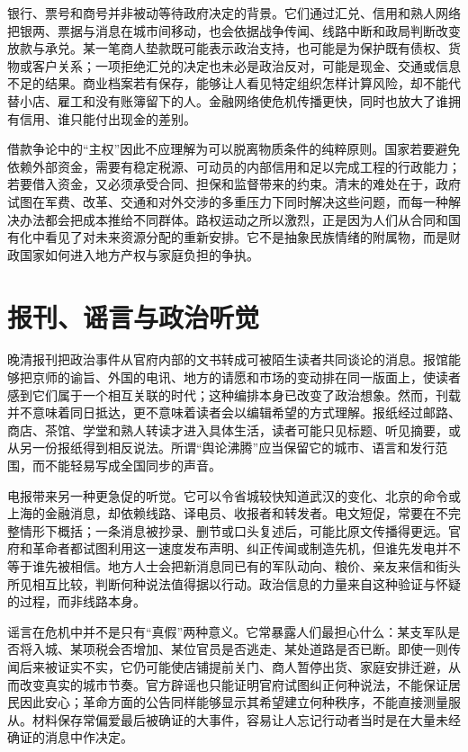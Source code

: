 银行、票号和商号并非被动等待政府决定的背景。它们通过汇兑、信用和熟人网络把银两、票据与消息在城市间移动，也会依据战争传闻、线路中断和政局判断改变放款与承兑。某一笔商人垫款既可能表示政治支持，也可能是为保护既有债权、货物或客户关系；一项拒绝汇兑的决定也未必是政治反对，可能是现金、交通或信息不足的结果。商业档案若有保存，能够让人看见特定组织怎样计算风险，却不能代替小店、雇工和没有账簿留下的人。金融网络使危机传播更快，同时也放大了谁拥有信用、谁只能付出现金的差别。

借款争论中的“主权”因此不应理解为可以脱离物质条件的纯粹原则。国家若要避免依赖外部资金，需要有稳定税源、可动员的内部信用和足以完成工程的行政能力；若要借入资金，又必须承受合同、担保和监督带来的约束。清末的难处在于，政府试图在军费、改革、交通和对外交涉的多重压力下同时解决这些问题，而每一种解决办法都会把成本推给不同群体。路权运动之所以激烈，正是因为人们从合同和国有化中看见了对未来资源分配的重新安排。它不是抽象民族情绪的附属物，而是财政国家如何进入地方产权与家庭负担的争执。

\section{报刊、谣言与政治听觉}

晚清报刊把政治事件从官府内部的文书转成可被陌生读者共同谈论的消息。报馆能够把京师的谕旨、外国的电讯、地方的请愿和市场的变动排在同一版面上，使读者感到它们属于一个相互关联的时代；这种编排本身已改变了政治想象。然而，刊载并不意味着同日抵达，更不意味着读者会以编辑希望的方式理解。报纸经过邮路、商店、茶馆、学堂和熟人转读才进入具体生活，读者可能只见标题、听见摘要，或从另一份报纸得到相反说法。所谓“舆论沸腾”应当保留它的城市、语言和发行范围，而不能轻易写成全国同步的声音。

电报带来另一种更急促的听觉。它可以令省城较快知道武汉的变化、北京的命令或上海的金融消息，却依赖线路、译电员、收报者和转发者。电文短促，常要在不完整情形下概括；一条消息被抄录、删节或口头复述后，可能比原文传播得更远。官府和革命者都试图利用这一速度发布声明、纠正传闻或制造先机，但谁先发电并不等于谁先被相信。地方人士会把新消息同已有的军队动向、粮价、亲友来信和街头所见相互比较，判断何种说法值得据以行动。政治信息的力量来自这种验证与怀疑的过程，而非线路本身。

谣言在危机中并不是只有“真假”两种意义。它常暴露人们最担心什么：某支军队是否将入城、某项税会否增加、某位官员是否逃走、某处道路是否已断。即使一则传闻后来被证实不实，它仍可能使店铺提前关门、商人暂停出货、家庭安排迁避，从而改变真实的城市节奏。官方辟谣也只能证明官府试图纠正何种说法，不能保证居民因此安心；革命方面的公告同样能够显示其希望建立何种秩序，不能直接测量服从。材料保存常偏爱最后被确证的大事件，容易让人忘记行动者当时是在大量未经确证的消息中作决定。

